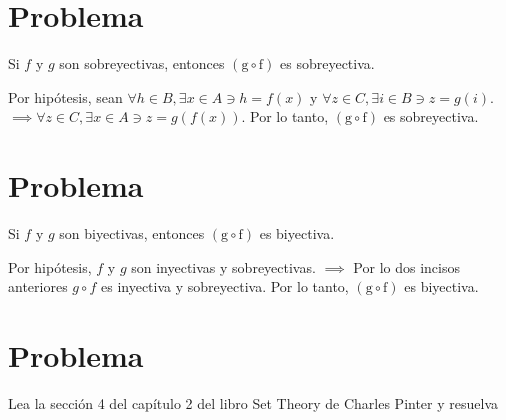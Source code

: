 \section{Problema}
\begin{problema}
	Si $f$ y $g$ son sobreyectivas, entonces $(\mathrm{g} \circ \mathrm{f})$ es sobreyectiva. 
\end{problema}
\begin{dem}
	Por hipótesis, sean $\forall h \in B, \exists x \in A \ni h=f(x)$ y $\forall z \in C, \exists i \in B \ni z=g(i)$.  $\implies \forall z \in C, \exists x \in A \ni z=g(f(x))$. Por lo tanto, $(\mathrm{g} \circ \mathrm{f})$ es sobreyectiva. 
\end{dem}

\section{Problema}
\begin{problema}
	Si $f$ y $g$ son biyectivas, entonces $(\mathrm{g} \circ \mathrm{f})$ es biyectiva.
\end{problema}
\begin{dem}
   Por hipótesis, $f$ y $g$ son inyectivas y sobreyectivas. $\implies$ Por lo dos incisos anteriores $g\circ f$ es inyectiva y sobreyectiva. Por lo tanto,  $(\mathrm{g} \circ \mathrm{f})$ es biyectiva.
\end{dem}

\section{Problema}
Lea la sección 4 del capítulo 2 del libro Set Theory de Charles Pinter y resuelva
